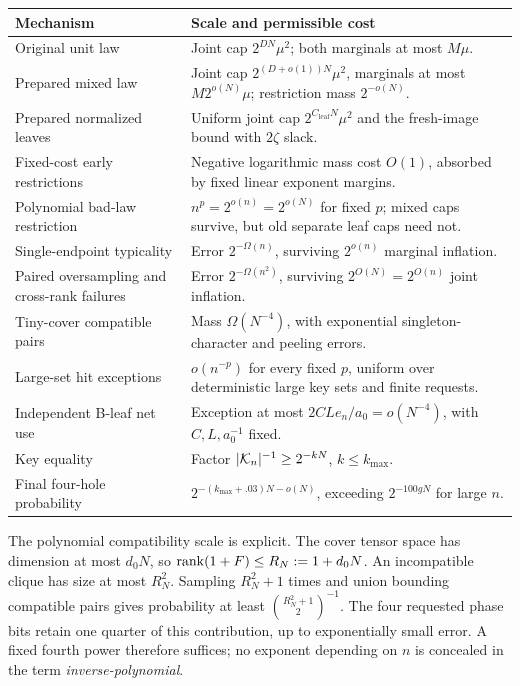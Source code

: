 \begin{center}
\begin{tabular}{@{}p{}p{}@{}}
\toprule
Mechanism & Scale and permissible cost\\
\midrule
Original unit law & Joint cap \(2^{DN}\mu^2\); both marginals
at most \(M\mu\).\\
Prepared mixed law & Joint cap \(2^{(D+o(1))N}\mu^2\), marginals
at most \(M2^{o(N)}\mu\); restriction mass \(2^{-o(N)}\).\\
Prepared normalized leaves & Uniform joint cap
\(2^{C_{\mathrm{leaf}}N}\mu^2\) and the fresh-image bound with
\(2\zeta\) slack.\\
Fixed-cost early restrictions & Negative logarithmic mass cost
\(O(1)\), absorbed by fixed linear exponent margins.\\
Polynomial bad-law restriction & \(n^p=2^{o(n)}=2^{o(N)}\) for
fixed \(p\); mixed caps survive, but old separate leaf caps need not.\\
Single-endpoint typicality & Error \(2^{-\Omega(n)}\), surviving
\(2^{o(n)}\) marginal inflation.\\
Paired oversampling and cross-rank failures & Error
\(2^{-\Omega(n^2)}\), surviving \(2^{O(N)}=2^{O(n)}\) joint inflation.\\
Tiny-cover compatible pairs & Mass \(\Omega(N^{-4})\), with
exponential singleton-character and peeling errors.\\
Large-set hit exceptions & \(o(n^{-p})\) for every fixed \(p\),
uniform over deterministic large key sets and finite requests.\\
Independent B-leaf net use & Exception at most
\(2CL e_n/a_0=o(N^{-4})\), with \(C,L,a_0^{-1}\) fixed.\\
Key equality & Factor \(|\mathcal K_n|^{-1}\ge2^{-kN}\),
\(k\le k_{\max}\).\\
Final four-hole probability &
\(2^{-(k_{\max}+.03)N-o(N)}\), exceeding \(2^{-100gN}\) for large \(n\).\\
\bottomrule
\end{tabular}
\end{center}

The polynomial compatibility scale is explicit.
The cover tensor space has dimension at most \(d_0N\), so
\(\operatorname{rank}(1+F)\le R_N:=1+d_0N\).
An incompatible clique has size at most \(R_N^2\).
Sampling \(R_N^2+1\) times and union bounding compatible pairs gives
probability at least \(\binom{R_N^2+1}{2}^{-1}\).
The four requested phase bits retain one quarter of this contribution,
up to exponentially small error.
A fixed fourth power therefore suffices; no exponent depending on
\(n\) is concealed in the term \emph{inverse-polynomial}.

